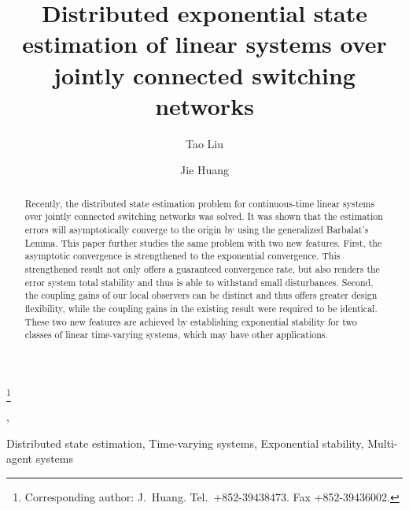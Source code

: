 \documentclass[twocolumn]{autart}
\begin{document}
\begin{frontmatter}


\title{Distributed exponential state estimation of linear systems over jointly connected switching networks}

\thanks[footnoteinfo]{
Corresponding author: J.\ Huang.
Tel.\ +852-39438473. Fax +852-39436002.
}

\author[]{Tao Liu},
\author[]{Jie Huang}



\address{Department of Mechanical and Automation Engineering, The Chinese University of Hong Kong, Shatin, N.T., Hong Kong}





\begin{keyword}
Distributed state estimation, Time-varying systems, Exponential stability, Multi-agent systems
\end{keyword}






\begin{abstract}
Recently, the distributed state estimation problem for continuous-time linear systems over jointly connected switching networks was solved.
It was shown that the estimation errors will asymptotically converge to the origin by using the generalized Barbalat's Lemma.
This paper further studies the same problem with two new features.
First, the asymptotic convergence is strengthened to the exponential convergence.
This strengthened result not only offers a guaranteed convergence rate,
but also renders the error system total stability and thus is able to withstand small disturbances.
Second, the coupling gains of our local observers can be distinct and thus offers greater design flexibility,
while the coupling gains in the existing result were required to be identical.
These two new features are achieved by establishing exponential stability for two classes of linear time-varying systems,
which may have other applications.

\end{abstract}

\end{frontmatter}
\end{document}
